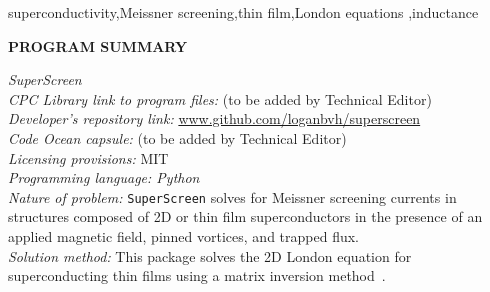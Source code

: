 \documentclass[final,3p,times]{elsarticle}
\newcommand{\inline}[1]{\texttt{#1}\xspace}
\newcommand{\SuperScreen}{\inline{SuperScreen}}
\begin{document}
\begin{frontmatter}
\begin{keyword}
superconductivity\sep Meissner screening\sep thin film\sep London equations \sep inductance

\end{keyword}

\end{frontmatter}


\noindent
{\bf PROGRAM SUMMARY}

\begin{small}
\noindent
{\em SuperScreen}\\
{\em CPC Library link to program files:} (to be added by Technical Editor) \\
{\em Developer's repository link:} \href{http://www.github.com/loganbvh/superscreen}{www.github.com/loganbvh/superscreen}\\
{\em Code Ocean capsule:} (to be added by Technical Editor)\\
{\em Licensing provisions:} MIT\\
{\em Programming language: Python}\\
{\em Nature of problem:} \SuperScreen solves for Meissner screening currents in structures composed of 2D or thin film superconductors in the presence of an applied magnetic field, pinned vortices, and trapped flux.\\
{\em Solution method:} This package solves the 2D London equation for superconducting thin films using a matrix inversion method~\cite{Brandt2004-ew,Brandt2005-wj}.\\
   \\


\end{small}
\end{document}

